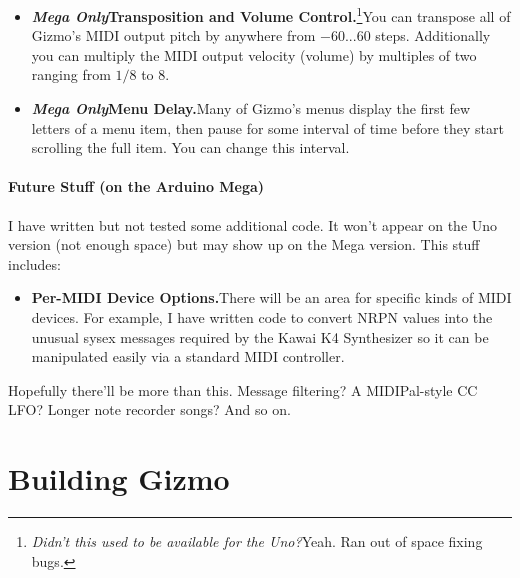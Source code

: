 \documentclass{article}
\begin{document}
\begin{itemize}
\item {\bf \textit{Mega Only}\quad Transposition and Volume Control.}\footnote{{\it Didn't this used to be available for the Uno?\quad}Yeah.  Ran out of space fixing bugs.}\quad You can transpose all of Gizmo's MIDI output pitch by anywhere from \(-60...60\) steps.  Additionally you can multiply the MIDI output velocity (volume) by multiples of two ranging from \(1/8\) to \(8\).

\item {\bf \textit{Mega Only}\quad Menu Delay.}\quad Many of Gizmo's menus display the first few letters of a menu item, then pause for some interval of time before they start scrolling the full item.  You can change this interval.

\end{itemize} 

\paragraph{Future Stuff (on the Arduino Mega)}

I have written but not tested some additional code.  It won't appear on the Uno version (not enough space) but may show up on the Mega version.  This stuff includes:

\begin{itemize}

\item {\bf Per-MIDI Device Options.}\quad There will be an area for specific kinds of MIDI devices.  For example, I have written code to convert NRPN values into the unusual sysex messages required by the Kawai K4 Synthesizer so it can be manipulated easily via a standard MIDI controller.

\end{itemize}

Hopefully there'll be more than this.  Message filtering?  A MIDIPal-style CC LFO?  Longer note recorder songs?  And so on.

\section{Building Gizmo}
\end{document}
